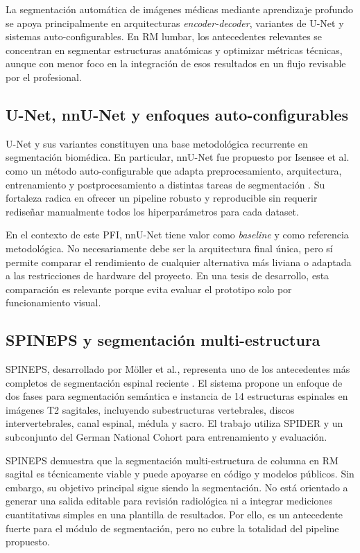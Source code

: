 La segmentación automática de imágenes médicas mediante aprendizaje profundo se apoya principalmente en arquitecturas \textit{encoder-decoder}, variantes de U-Net y sistemas auto-configurables. En RM lumbar, los antecedentes relevantes se concentran en segmentar estructuras anatómicas y optimizar métricas técnicas, aunque con menor foco en la integración de esos resultados en un flujo revisable por el profesional.

\subsection{U-Net, nnU-Net y enfoques auto-configurables}

U-Net y sus variantes constituyen una base metodológica recurrente en segmentación biomédica. En particular, nnU-Net fue propuesto por Isensee et al. como un método auto-configurable que adapta preprocesamiento, arquitectura, entrenamiento y postprocesamiento a distintas tareas de segmentación \parencite{isensee_nnunet_2021}. Su fortaleza radica en ofrecer un pipeline robusto y reproducible sin requerir rediseñar manualmente todos los hiperparámetros para cada dataset.

En el contexto de este PFI, nnU-Net tiene valor como \textit{baseline} y como referencia metodológica. No necesariamente debe ser la arquitectura final única, pero sí permite comparar el rendimiento de cualquier alternativa más liviana o adaptada a las restricciones de hardware del proyecto. En una tesis de desarrollo, esta comparación es relevante porque evita evaluar el prototipo solo por funcionamiento visual.

\subsection{SPINEPS y segmentación multi-estructura}

SPINEPS, desarrollado por Möller et al., representa uno de los antecedentes más completos de segmentación espinal reciente \parencite{moller_spineps_2025}. El sistema propone un enfoque de dos fases para segmentación semántica e instancia de 14 estructuras espinales en imágenes T2 sagitales, incluyendo subestructuras vertebrales, discos intervertebrales, canal espinal, médula y sacro. El trabajo utiliza SPIDER y un subconjunto del German National Cohort para entrenamiento y evaluación.

SPINEPS demuestra que la segmentación multi-estructura de columna en RM sagital es técnicamente viable y puede apoyarse en código y modelos públicos. Sin embargo, su objetivo principal sigue siendo la segmentación. No está orientado a generar una salida editable para revisión radiológica ni a integrar mediciones cuantitativas simples en una plantilla de resultados. Por ello, es un antecedente fuerte para el módulo de segmentación, pero no cubre la totalidad del pipeline propuesto.

